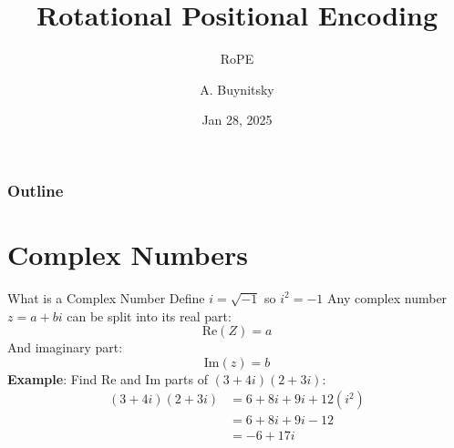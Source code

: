 \documentclass{beamer}
\title[RoPE]{Rotational Positional Encoding}
\subtitle{RoPE} %
\author[MLP]{A. Buynitsky}
\date{Jan 28, 2025}
\begin{document}
\frame{\titlepage}


\begin{frame}
\frametitle{Outline}
\tableofcontents
\end{frame}
\section{Complex Numbers}
\begin{frame}[t]{What is a Complex Number}
    Define $i = \sqrt{-1}$ so $i^2 = -1$ \newline
    Any complex number $z = a + b i$ can be split into its real part:
    \[\text{Re}(Z) = a\]
    And imaginary part: 
    \[\text{Im}(z) = b\]
    \textbf{Example}: Find Re and Im parts of $(3 + 4i)(2 + 3i)$: \newline
    \begin{align*}
        (3 + 4i)(2 + 3i) &= 6 + 8i + 9i + 12(i^2)\\
        &= 6 + 8i + 9i - 12\\
        &= -6 + 17i
    \end{align*}





\end{frame}
\end{document}
